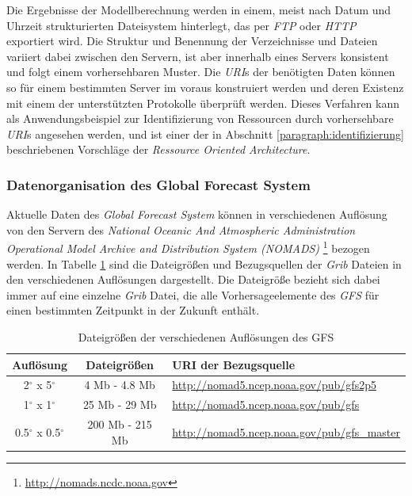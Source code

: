 Die Ergebnisse der Modellberechnung werden in einem, meist nach Datum
und Uhrzeit strukturierten Dateisystem hinterlegt, das per
\textit{FTP} oder \textit{HTTP} exportiert wird. Die Struktur und
Benennung der Verzeichnisse und Dateien variiert dabei zwischen den
Servern, ist aber innerhalb eines Servers konsistent und folgt einem
vorhersehbaren Muster. Die \textit{URI}s der benötigten Daten können
so für einem bestimmten Server im voraus konstruiert werden und deren
Existenz mit einem der unterstützten Protokolle überprüft
werden. Dieses Verfahren kann als Anwendungsbeispiel zur
Identifizierung von Ressourcen durch vorhersehbare \textit{URI}s
angesehen werden, und ist einer der in Abschnitt
\ref{paragraph:identifizierung} beschriebenen Vorschläge der
\textit{Ressource Oriented Architecture}.

\subsubsection{Datenorganisation des Global Forecast System}

Aktuelle Daten des \textit{Global Forecast System} können in
verschiedenen Auflösung von den Servern des \textit{National Oceanic
  And Atmospheric Administration Operational Model Archive and
  Distribution System (NOMADS)} 
\footnote{\url{http://nomads.ncdc.noaa.gov}} bezogen werden. In
Tabelle \ref{tab:gfs_auflösungen} sind die Dateigrößen und
Bezugsquellen der \textit{Grib} Dateien in den verschiedenen
Auflösungen dargestellt. Die Dateigröße bezieht sich dabei immer auf
eine einzelne \textit{Grib} Datei, die alle Vorhersageelemente des
\textit{GFS} für einen bestimmten Zeitpunkt in der Zukunft enthält.

\begin{table}[h]
  \centering
  {\sf
    \footnotesize
    \begin{longtable}{@{}ccl}

      \toprule
      \textbf{Auflösung} & \textbf{Dateigrößen} & \textbf{URI der Bezugsquelle} \\

      \midrule

      2$^{\circ}$ x 5$^{\circ}$ & 4 Mb - 4.8 Mb & \url{http://nomad5.ncep.noaa.gov/pub/gfs2p5} \\
      1$^{\circ}$ x 1$^{\circ}$ & 25 Mb - 29 Mb & \url{http://nomad5.ncep.noaa.gov/pub/gfs} \\
      0.5$^{\circ}$ x 0.5$^{\circ}$ & 200 Mb - 215 Mb & \url{http://nomad5.ncep.noaa.gov/pub/gfs_master} \\

      \bottomrule

    \end{longtable}
  }

  \caption{Dateigrößen der verschiedenen Auflösungen des GFS}
  \label{tab:gfs_auflösungen}

\end{table}

